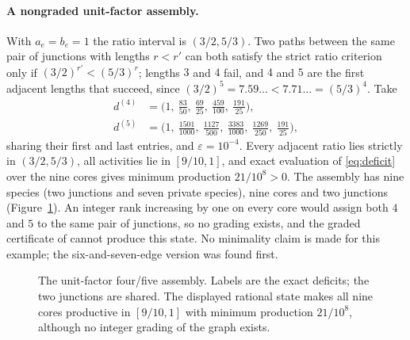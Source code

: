 \documentclass[11pt,a4paper]{article}
\theoremstyle{plain}
\theoremstyle{definition}
\theoremstyle{remark}
\begin{document}
\paragraph{A nongraded unit-factor assembly.} With $a_e=b_e=1$ the ratio interval is $(3/2,5/3)$. Two paths between the same pair of junctions with lengths $r<r'$ can both satisfy the strict ratio criterion only if $(3/2)^{r'}<(5/3)^{r}$; lengths $3$ and $4$ fail, and $4$ and $5$ are the first adjacent lengths that succeed, since $(3/2)^5=7.59\ldots<7.71\ldots=(5/3)^4$. Take
\begin{align*}
  d^{(4)}&=\bigl(1,\ \tfrac{83}{50},\ \tfrac{69}{25},\ \tfrac{459}{100},\ \tfrac{191}{25}\bigr),\\
  d^{(5)}&=\bigl(1,\ \tfrac{1501}{1000},\ \tfrac{1127}{500},\ \tfrac{3383}{1000},\ \tfrac{1269}{250},\ \tfrac{191}{25}\bigr),
\end{align*}
sharing their first and last entries, and $\varepsilon=10^{-4}$. Every adjacent ratio lies strictly in $(3/2,5/3)$, all activities lie in $[9/10,1]$, and exact evaluation of \eqref{eq:deficit} over the nine cores gives minimum production $21/10^8>0$. The assembly has nine species (two junctions and seven private species), nine cores and two junctions (Figure~\ref{fig:nongraded}). An integer rank increasing by one on every core would assign both $4$ and $5$ to the same pair of junctions, so no grading exists, and the graded certificate of \citep{tcch2026} cannot produce this state. No minimality claim is made for this example; the six-and-seven-edge version was found first.

\begin{figure}[t]
\centering
{}
\caption{The unit-factor four/five assembly. Labels are the exact deficits; the two junctions are shared. The displayed rational state makes all nine cores productive in $[9/10,1]$ with minimum production $21/10^8$, although no integer grading of the graph exists.}
\label{fig:nongraded}
\end{figure}
\end{document}
